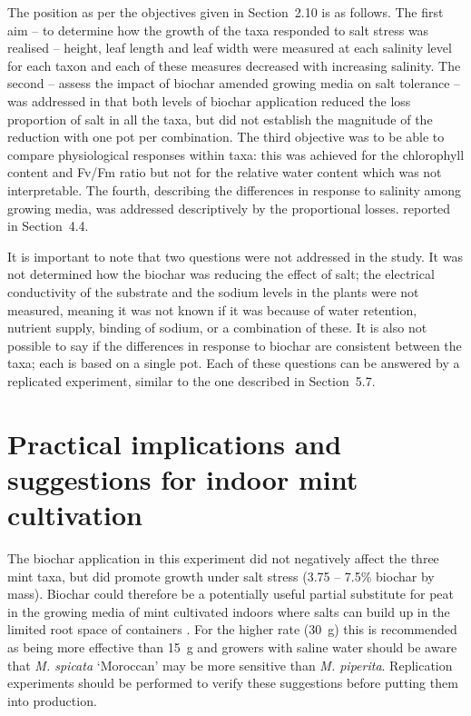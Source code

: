 The position as per the objectives given in Section~2.10 is as follows. The first aim – to determine how the growth of the taxa responded to salt stress was realised – height, leaf length and leaf width were measured at each salinity level for each taxon and each of these measures decreased with increasing salinity. The second – assess the impact of biochar amended growing media on salt tolerance – was addressed in that both levels of biochar application reduced the loss proportion of salt in all the taxa, but did not establish the magnitude of the reduction with one pot per combination. The third objective was to be able to compare physiological responses within taxa: this was achieved for the chlorophyll content and Fv/Fm ratio but not for the relative water content which was not interpretable. The fourth, describing the differences in response to salinity among growing media, was addressed descriptively by the proportional losses. reported in Section~4.4.

It is important to note that two questions were not addressed in the study. It was not determined how the biochar was reducing the effect of salt; the electrical conductivity of the substrate and the sodium levels in the plants were not measured, meaning it was not known if it was because of water retention, nutrient supply, binding of sodium, or a combination of these. It is also not possible to say if the differences in response to biochar are consistent between the taxa; each is based on a single pot. Each of these questions can be answered by a replicated experiment, similar to the one described in Section~5.7.

\section{Practical implications and suggestions for indoor mint cultivation}

The biochar application in this experiment did not negatively affect the three mint taxa, but did promote growth under salt stress (3.75 – 7.5\% biochar by mass). Biochar could therefore be a potentially useful partial substitute for peat in the growing media of mint cultivated indoors where salts can build up in the limited root space of containers \parencite{Dumroese2018, Hasanuzzaman2021}. For the higher rate (30~g) this is recommended as being more effective than 15~g and growers with saline water should be aware that \textit{M. spicata} `Moroccan' may be more sensitive than \textit{M. piperita}. Replication experiments should be performed to verify these suggestions before putting them into production.

